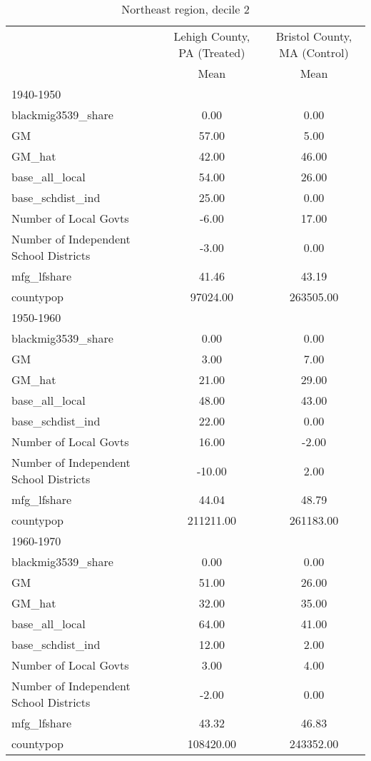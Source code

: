 \begin{table}[htbp]\centering
\def\sym#1{\ifmmode^{#1}\else\(^{#1}\)\fi}
\caption{Northeast region, decile 2 \label{tab1}}
\begin{tabular}{l*{2}{c}}
\toprule
                    &\multicolumn{1}{c}{Lehigh County, PA (Treated)}&\multicolumn{1}{c}{Bristol County, MA (Control)}\\
                    &        Mean&        Mean\\
\midrule
1940-1950           &            &            \\
blackmig3539\_share  &        0.00&        0.00\\
GM                  &       57.00&        5.00\\
GM\_hat              &       42.00&       46.00\\
base\_all\_local      &       54.00&       26.00\\
base\_schdist\_ind    &       25.00&        0.00\\
Number of Local Govts&       -6.00&       17.00\\
Number of Independent School Districts&       -3.00&        0.00\\
mfg\_lfshare         &       41.46&       43.19\\
countypop           &    97024.00&   263505.00\\
\midrule
1950-1960           &            &            \\
blackmig3539\_share  &        0.00&        0.00\\
GM                  &        3.00&        7.00\\
GM\_hat              &       21.00&       29.00\\
base\_all\_local      &       48.00&       43.00\\
base\_schdist\_ind    &       22.00&        0.00\\
Number of Local Govts&       16.00&       -2.00\\
Number of Independent School Districts&      -10.00&        2.00\\
mfg\_lfshare         &       44.04&       48.79\\
countypop           &   211211.00&   261183.00\\
\midrule
1960-1970           &            &            \\
blackmig3539\_share  &        0.00&        0.00\\
GM                  &       51.00&       26.00\\
GM\_hat              &       32.00&       35.00\\
base\_all\_local      &       64.00&       41.00\\
base\_schdist\_ind    &       12.00&        2.00\\
Number of Local Govts&        3.00&        4.00\\
Number of Independent School Districts&       -2.00&        0.00\\
mfg\_lfshare         &       43.32&       46.83\\
countypop           &   108420.00&   243352.00\\
\bottomrule
\end{tabular}
\end{table}
